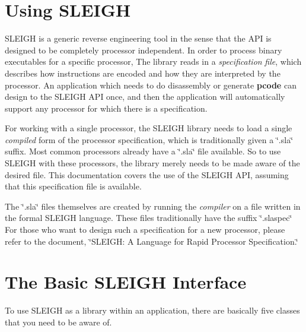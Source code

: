 \begin{DoxyCode}{0}
\DoxyCodeLine{\textcolor{preprocessor}{\# The C compiler}}
\DoxyCodeLine{}
\DoxyCodeLine{\textcolor{preprocessor}{\# Debug flags}}
\DoxyCodeLine{}
\DoxyCodeLine{}
\DoxyCodeLine{\textcolor{preprocessor}{\# libraries}}
\DoxyCodeLine{}
\DoxyCodeLine{}
\DoxyCodeLine{}
\end{DoxyCode}
\hypertarget{sleigh_sleighuse}{}\section{Using S\+L\+E\+I\+GH}\label{sleigh_sleighuse}
S\+L\+E\+I\+GH is a generic reverse engineering tool in the sense that the A\+PI is designed to be completely processor independent. In order to process binary executables for a specific processor, The library reads in a {\itshape specification} {\itshape file}, which describes how instructions are encoded and how they are interpreted by the processor. An application which needs to do disassembly or generate {\bfseries{pcode}} can design to the S\+L\+E\+I\+GH A\+PI once, and then the application will automatically support any processor for which there is a specification.

For working with a single processor, the S\+L\+E\+I\+GH library needs to load a single {\itshape compiled} form of the processor specification, which is traditionally given a \char`\"{}.\+sla\char`\"{} suffix. Most common processors already have a \char`\"{}.\+sla\char`\"{} file available. So to use S\+L\+E\+I\+GH with these processors, the library merely needs to be made aware of the desired file. This documentation covers the use of the S\+L\+E\+I\+GH A\+PI, assuming that this specification file is available.

The \char`\"{}.\+sla\char`\"{} files themselves are created by running the {\itshape compiler} on a file written in the formal S\+L\+E\+I\+GH language. These files traditionally have the suffix \char`\"{}.\+slaspec\char`\"{} For those who want to design such a specification for a new processor, please refer to the document, \char`\"{}\+S\+L\+E\+I\+G\+H\+: A Language
for Rapid Processor Specification.\char`\"{} \hypertarget{sleighAPIbasic}{}\section{The Basic S\+L\+E\+I\+GH Interface}\label{sleighAPIbasic}
To use S\+L\+E\+I\+GH as a library within an application, there are basically five classes that you need to be aware of.


